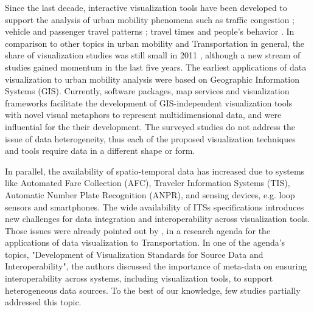 \documentclass[]{interact}
\theoremstyle{plain}%
\theoremstyle{definition}
\theoremstyle{remark}
\theoremstyle{definition}
\begin{document}
Since the last decade, interactive visualization tools have been developed to support the analysis of urban mobility phenomena such as traffic congestion \citep{Cheng2013,Wang2013}; vehicle and passenger travel patterns \citep{Mao2016,Lu2016,Andrienko2016a,Chen2016,Huang2016,VonLandesberger2016,nunes2017}; travel times and people's behavior \citep{Wu2012, Zeng2014}. In comparison to other topics in urban mobility and Transportation in general, the share of visualization studies was still small in 2011 \citep{Zhang2011}, although a new stream of studies gained momentum in the last five years. The earliest applications of data visualization to urban mobility analysis were based on Geographic Information Systems (GIS). Currently, software packages, map services and visualization frameworks facilitate the development of GIS-independent visualization tools with novel visual metaphors to represent multidimensional data, and were influential for the their development. The surveyed studies do not address the issue of data heterogeneity, thus each of the proposed visualization techniques and tools require data in a different shape or form.

In parallel, the availability of spatio-temporal data has increased due to systems like Automated Fare Collection (AFC), Traveler Information Systems (TIS), Automatic Number Plate Recognition (ANPR), and sensing devices, e.g. loop sensors and smartphones. The wide availability of ITSs specifications introduces new challenges for data integration and interoperability across visualization tools. Those issues were already pointed out by \cite{Hughes2005}, in a research agenda for the applications of data visualization to Transportation. In one of the agenda's topics, "Development of Visualization Standards for Source Data and Interoperability", the authors discussed the importance of meta-data on ensuring interoperability across systems, including visualization tools, to support heterogeneous data sources. To the best of our knowledge, few studies partially addressed this topic.
\end{document}
